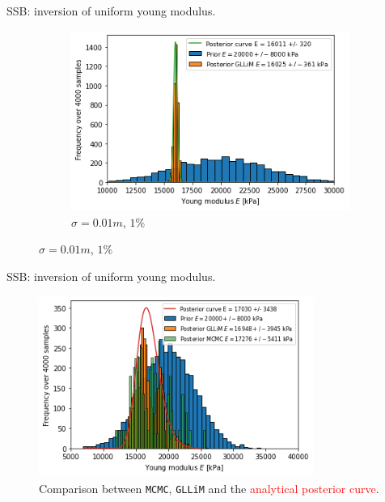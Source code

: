 \begin{frame}{SSB: inversion of uniform young modulus.}
\begin{figure}
	\begin{subfigure}{0.40\textwidth}
	\includegraphics[width=\textwidth]{graphs/E_single/bayes_inversion_disc=0.01.png}
	\caption{$\sigma = 0.01 \si{m}$, $1\%$}
	\end{subfigure}
	\end{figure}
	\end{frame}
	
	\begin{frame}{SSB: inversion of uniform young modulus.}
	\begin{figure}
	\includegraphics[width=0.8\textwidth]{graphs/E_single/bayes_inversion_disc=0.1_all.png}
	\caption{Comparison between \texttt{MCMC}, \texttt{GLLiM} and the \textcolor{red}{analytical posterior curve}.}
	\end{figure}
	\end{frame}
	
